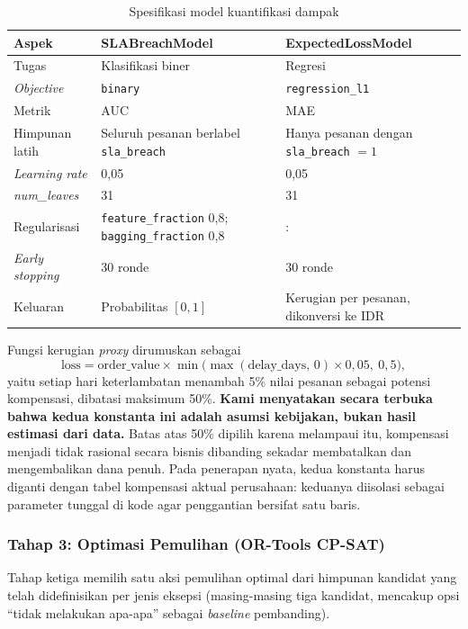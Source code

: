 \documentclass[12pt,a4paper]{article}
\begin{document}
\begin{table}[H]
  \centering\footnotesize
  \caption{Spesifikasi model kuantifikasi dampak}
  \begin{tabularx}{\textwidth}{L{3.1cm} Y Y}
    \toprule
    \textbf{Aspek} & \textbf{SLABreachModel} & \textbf{ExpectedLossModel} \\
    \midrule
    Tugas          & Klasifikasi biner & Regresi \\
    \textit{Objective} & \texttt{binary} & \texttt{regression\_l1} \\
    Metrik         & AUC & MAE \\
    Himpunan latih & Seluruh pesanan berlabel \texttt{sla\_breach} & Hanya pesanan dengan \texttt{sla\_breach} $=1$ \\
    \textit{Learning rate} & 0,05 & 0,05 \\
    \textit{num\_leaves} & 31 & 31 \\
    Regularisasi   & \texttt{feature\_fraction} 0,8; \texttt{bagging\_fraction} 0,8 &: \\
    \textit{Early stopping} & 30 ronde & 30 ronde \\
    Keluaran       & Probabilitas $[0,1]$ & Kerugian per pesanan, dikonversi ke IDR \\
    \bottomrule
  \end{tabularx}
\end{table}

Fungsi kerugian \textit{proxy} dirumuskan sebagai
\[
  \text{loss} = \text{order\_value} \times \min\bigl(\max(\text{delay\_days},\,0) \times 0{,}05,\ 0{,}5\bigr),
\]
yaitu setiap hari keterlambatan menambah 5\% nilai pesanan sebagai potensi kompensasi, dibatasi maksimum 50\%. \textbf{Kami menyatakan secara terbuka bahwa kedua konstanta ini adalah asumsi kebijakan, bukan hasil estimasi dari data.} Batas atas 50\% dipilih karena melampaui itu, kompensasi menjadi tidak rasional secara bisnis dibanding sekadar membatalkan dan mengembalikan dana penuh. Pada penerapan nyata, kedua konstanta harus diganti dengan tabel kompensasi aktual perusahaan: keduanya diisolasi sebagai parameter tunggal di kode agar penggantian bersifat satu baris.

\subsubsection{Tahap 3: Optimasi Pemulihan (OR-Tools CP-SAT)}

Tahap ketiga memilih satu aksi pemulihan optimal dari himpunan kandidat yang telah didefinisikan per jenis eksepsi (masing-masing tiga kandidat, mencakup opsi ``tidak melakukan apa-apa'' sebagai \textit{baseline} pembanding).
\end{document}
